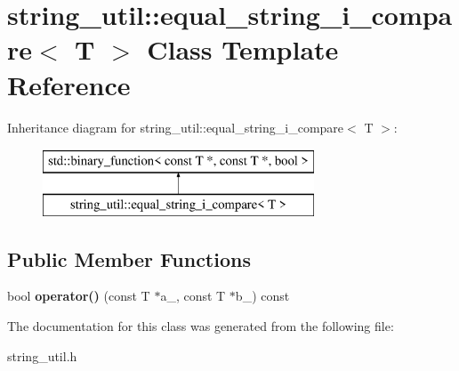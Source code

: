 \hypertarget{classstring__util_1_1equal__string__i__compare}{\section{string\+\_\+util\+:\+:equal\+\_\+string\+\_\+i\+\_\+compare$<$ T $>$ Class Template Reference}
\label{classstring__util_1_1equal__string__i__compare}
}
Inheritance diagram for string\+\_\+util\+:\+:equal\+\_\+string\+\_\+i\+\_\+compare$<$ T $>$\+:\begin{figure}[H]
\begin{center}
\leavevmode
\includegraphics[height=2.000000cm]{classstring__util_1_1equal__string__i__compare}
\end{center}
\end{figure}
\subsection*{Public Member Functions}
\begin{DoxyCompactItemize}
\item 
\hypertarget{classstring__util_1_1equal__string__i__compare_af8c94159bbb8903c7cf7b71941a7d2bc}{bool {\bfseries operator()} (const T $\ast$a\+\_\+, const T $\ast$b\+\_\+) const }\label{classstring__util_1_1equal__string__i__compare_af8c94159bbb8903c7cf7b71941a7d2bc}

\end{DoxyCompactItemize}


The documentation for this class was generated from the following file\+:\begin{DoxyCompactItemize}
\item 
string\+\_\+util.\+h\end{DoxyCompactItemize}
